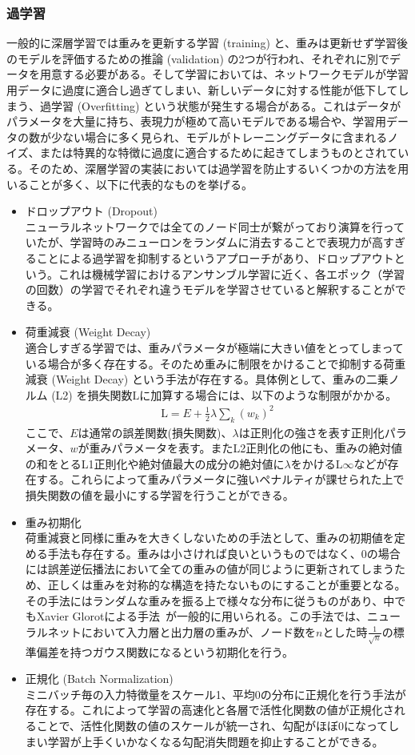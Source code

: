 \subsubsection{過学習}
一般的に深層学習では重みを更新する学習 (training) と、重みは更新せず学習後のモデルを評価するための推論 (validation) の2つが行われ、それぞれに別でデータを用意する必要がある。そして学習においては、ネットワークモデルが学習用データに過度に適合し過ぎてしまい、新しいデータに対する性能が低下してしまう、過学習 (Overfitting) という状態が発生する場合がある。これはデータがパラメータを大量に持ち、表現力が極めて高いモデルである場合や、学習用データの数が少ない場合に多く見られ、モデルがトレーニングデータに含まれるノイズ、または特異的な特徴に過度に適合するために起きてしまうものとされている。そのため、深層学習の実装においては過学習を防止するいくつかの方法を用いることが多く、以下に代表的なものを挙げる。
\begin{itemize}
\item ドロップアウト (Dropout)\\
ニューラルネットワークでは全てのノード同士が繋がっており演算を行っていたが、学習時のみニューロンをランダムに消去することで表現力が高すぎることによる過学習を抑制するというアプローチがあり、ドロップアウトという。これは機械学習におけるアンサンブル学習に近く、各エポック（学習の回数）の学習でそれぞれ違うモデルを学習させていると解釈することができる。
\item 荷重減衰 (Weight Decay)\\
適合しすぎる学習では、重みパラメータが極端に大きい値をとってしまっている場合が多く存在する。そのため重みに制限をかけることで抑制する荷重減衰 (Weight Decay) という手法が存在する。具体例として、重みの二乗ノルム (L2) を損失関数$\mathrm{L}$に加算する場合には、以下のような制限がかかる。
\begin{align}
\mathrm{L} = E + \frac{1}{2}\lambda \sum_k {(w_k)}^2
\end{align}
ここで、$E$は通常の誤差関数(損失関数)、$\lambda$は正則化の強さを表す正則化パラメータ、$w$が重みパラメータを表す。またL2正則化の他にも、重みの絶対値の和をとるL1正則化や絶対値最大の成分の絶対値に$\lambda$をかけるL$\infty$などが存在する。これらによって重みパラメータに強いペナルティが課せられた上で損失関数の値を最小にする学習を行うことができる。
\item 重み初期化\\
荷重減衰と同様に重みを大きくしないための手法として、重みの初期値を定める手法も存在する。重みは小さければ良いというものではなく、0の場合には誤差逆伝播法において全ての重みの値が同じように更新されてしまうため、正しくは重みを対称的な構造を持たないものにすることが重要となる。その手法にはランダムな重みを振る上で様々な分布に従うものがあり、中でもXavier Glorotによる手法~\cite{init}が一般的に用いられる。この手法では、ニューラルネットにおいて入力層と出力層の重みが、ノード数を$n$とした時$\frac{1}{\sqrt{n}}$の標準偏差を持つガウス関数になるという初期化を行う。
\item 正規化 (Batch Normalization)\\
ミニバッチ毎の入力特徴量をスケール1、平均0の分布に正規化を行う手法が存在する。これによって学習の高速化と各層で活性化関数の値が正規化されることで、活性化関数の値のスケールが統一され、勾配がほぼ0になってしまい学習が上手くいかなくなる勾配消失問題を抑止することができる。
\end{itemize}
